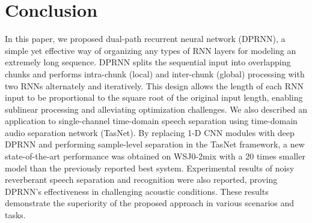 \documentclass{article}
\begin{document}
\section{Conclusion}
\label{sec:conclusion}
In this paper, we proposed dual-path recurrent neural network (DPRNN), a simple yet effective way of organizing any types of RNN layers for modeling an extremely long sequence. DPRNN splits the sequential input into overlapping chunks and performs intra-chunk (local) and inter-chunk (global) processing with two RNNs alternately and iteratively. This design allows the length of each RNN input to be proportional to the square root of the original input length, enabling sublinear processing and alleviating optimization challenges. We also described an application to single-channel time-domain speech separation using time-domain audio separation network (TasNet). By replacing 1-D CNN modules with deep DPRNN and performing sample-level separation in the TasNet framework, a new state-of-the-art performance was obtained on WSJ0-2mix with a 20 times smaller model than the previously reported best system. Experimental results of noisy reverberant speech separation and recognition were also reported, proving DPRNN's effectiveness in challenging acoustic conditions. These results demonstrate the superiority of the proposed approach in various scenarios and tasks. 


\end{document}
